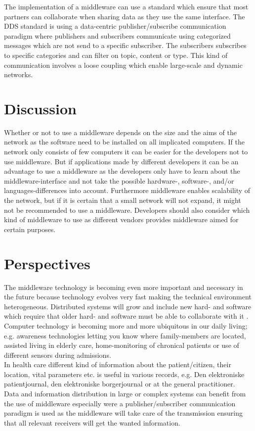\documentclass[Main]{subfiles}
\begin{document}
The implementation of a middleware can use a standard which ensure that most partners can collaborate when sharing data as they use the same interface. The DDS standard is using a data-centric publisher/subscribe communication paradigm where publishers and subscribers communicate using categorized messages which are not send to a specific subscriber. The subscribers subscribes to specific categories and can filter on topic, content or type. This kind of communication involves a loose coupling which enable large-scale and dynamic networks.

\section{Discussion}
Whether or not to use a middleware depends on the size and the aims of the network as the software need to be installed on all implicated computers. If the network only consists of few computers it can be easier for the developers not to use middleware. But if applications made by different developers it can be an advantage to use a middleware as the developers only have to learn about the middleware-interface and not take the possible hardware-, software-, and/or languages-differences into account. Furthermore middleware enables scalability of the network, but if it is certain that a small network will not expand, it might not be recommended to use a middleware. Developers should also consider which kind of middleware to use as different vendors provides middleware aimed for certain purposes. 

\section{Perspectives}
The middleware technology is becoming even more important and necessary in the future because technology evolves very fast making the technical environment heterogeneous. Distributed systems will grow and include new hard- and software which require that older hard- and software must be able to collaborate with it  \cite{whereIsMiddleware}.\\Computer technology is becoming more and more ubiquitous in our daily living; e.g. awareness technologies letting you know where family-members are located, assisted living in elderly care, home-monitoring of chronical patients or use of different sensors during admissions.\\In health care different kind of information about the patient/citizen, their location, vital parameters etc. is useful in various records, e.g. Den elektroniske patientjournal, den elektroniske borgerjournal or at the general practitioner.\\Data and information distribution in large or complex systems can benefit from the use of middleware especially were a publisher/subscriber communication paradigm is used as the middleware will take care of the transmission ensuring that all relevant receivers will get the wanted information.
\end{document}
